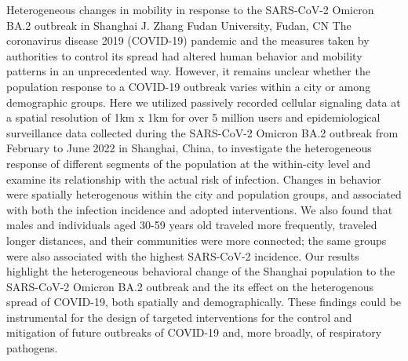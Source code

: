 
    \begin{abstract_online}{Heterogeneous changes in mobility in response to the SARS-CoV-2 Omicron BA.2 outbreak in Shanghai}{%
        J. Zhang}{%
        }{%
        Fudan University, Fudan, CN}
    The coronavirus disease 2019 (COVID-19) pandemic and the measures taken by authorities to control its spread had altered human behavior and mobility patterns in an unprecedented way. However, it remains unclear whether the population response to a COVID-19 outbreak varies within a city or among demographic groups. Here we utilized passively recorded cellular signaling data at a spatial resolution of 1km x 1km for over 5 million users and epidemiological surveillance data collected during the SARS-CoV-2 Omicron BA.2 outbreak from February to June 2022 in Shanghai, China, to investigate the heterogeneous response of different segments of the population at the within-city level and examine its relationship with the actual risk of infection. Changes in behavior were spatially heterogenous within the city and population groups, and associated with both the infection incidence and adopted interventions. We also found that males and individuals aged 30-59 years old traveled more frequently, traveled longer distances, and their communities were more connected; the same groups were also associated with the highest SARS-CoV-2 incidence. Our results highlight the heterogeneous behavioral change of the Shanghai population to the SARS-CoV-2 Omicron BA.2 outbreak and the its effect on the heterogenous spread of COVID-19, both spatially and demographically. These findings could be instrumental for the design of targeted interventions for the control and mitigation of future outbreaks of COVID-19 and, more broadly, of respiratory pathogens. 
    
    \end{abstract_online}
    